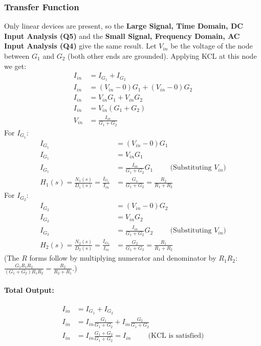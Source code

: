 \subsubsection{Transfer Function}
Only linear devices are present, so the \textbf{Large Signal, Time Domain,
DC Input Analysis (Q5)} and the \textbf{Small Signal, Frequency Domain, AC
Input Analysis (Q4)} give the same result. Let \(V_{in}\) be the voltage of
the node between \(G_1\) and \(G_2\) (both other ends are grounded).
Applying KCL at this node we get:
\begin{align*}
  I_{in} &= I_{G_1} + I_{G_2} \\
  I_{in} &= (V_{in} - 0)G_1 + (V_{in} - 0)G_2 \\
  I_{in} &= V_{in}G_1 + V_{in}G_2 \\
  I_{in} &= V_{in}(G_1 + G_2) \\
  V_{in} &= \frac{I_{in}}{G_1 + G_2}
\end{align*}
For \(I_{G_1}\):
\begin{align*}
  I_{G_1} &= (V_{in} - 0)G_1 \\
  I_{G_1} &= V_{in}G_1 \\
  I_{G_1} &= \frac{I_{in}}{G_1 + G_2}G_1 \hspace{1cm} \text{(Substituting \(V_{in}\))} \\
  H_1(s) = \frac{N_1(s)}{D_1(s)} = \frac{I_{G_1}}{I_{in}} &= \frac{G_1}{G_1 + G_2} = \frac{R_2}{R_1 + R_2}
\end{align*}
For \(I_{G_2}\):
\begin{align*}
  I_{G_2} &= (V_{in} - 0)G_2 \\
  I_{G_2} &= V_{in}G_2 \\
  I_{G_2} &= \frac{I_{in}}{G_1 + G_2}G_2 \hspace{1cm} \text{(Substituting \(V_{in}\))} \\
  H_2(s) = \frac{N_2(s)}{D_2(s)} = \frac{I_{G_2}}{I_{in}} &= \frac{G_2}{G_1 + G_2} = \frac{R_1}{R_1 + R_2}
\end{align*}
(The \(R\) forms follow by multiplying numerator and denominator by
\(R_1 R_2\): \(\frac{G_1 R_1 R_2}{(G_1 + G_2) R_1 R_2} = \frac{R_2}{R_2 + R_1}\).)
\paragraph{Total Output:}
\begin{align*}
  I_{in} &= I_{G_1} + I_{G_2} \\
  I_{in} &= I_{in} \frac{G_1}{G_1 + G_2} + I_{in} \frac{G_2}{G_1 + G_2} \\
  I_{in} &= I_{in} \frac{G_1 + G_2}{G_1 + G_2} = I_{in} \hspace{1cm} \text{(KCL is satisfied)}
\end{align*}

